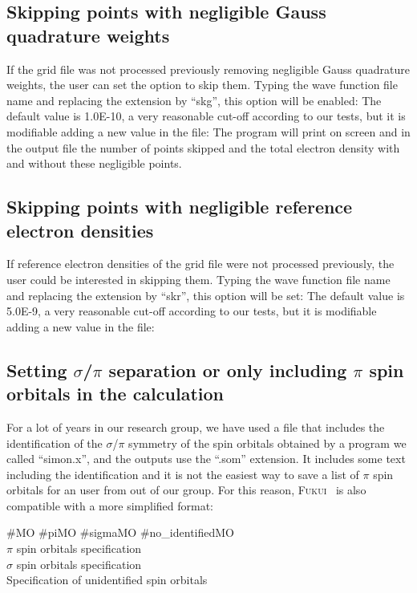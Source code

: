 \documentclass[a4paper,11pt,openany]{memoir}
\newcommand\programa{\textsc{Fukui}}
\begin{document}
\subsection{Skipping points with negligible Gauss quadrature weights}
If the grid file was not processed previously removing negligible Gauss quadrature weights, the user can set the option to skip them. Typing the wave function file name and replacing the extension by ``skg'', this option will be enabled:
The default value is \num{1.0E-10}, a very reasonable cut-off according to our tests, but it is modifiable adding a new value in the file:
The program will print on screen and in the output file the number of points skipped and  the total electron density with and without these negligible points.

\subsection{Skipping points with negligible reference electron densities}
If reference electron densities of the grid file were not processed previously, the user could be interested in skipping them. Typing the wave function file name and replacing the extension by ``skr'', this option will be set:
The default value is \num{5.0E-9}, a very reasonable cut-off according to our tests, but it is modifiable adding a new value in the file:

\subsection{Setting $\sigma$/$\pi$ separation or only including $\pi$ spin orbitals in the calculation}
For a lot of years in our research group, we have used a file that includes the identification of the $\sigma$/$\pi$ symmetry of the spin orbitals obtained by a program we called ``simon.x'', and the outputs use the ``.som'' extension. It includes some text including the identification and it is not the easiest way to save a list of $\pi$ spin orbitals for an user from out of our group. For this reason, \programa~ is also compatible with a more simplified format:
\begin{tcolorbox}[
	colback=blue!5!black!5!,
	colframe=blue!75!black,
	fontupper=\bfseries,
	colupper=blue!5!black,
	colbacktitle=blue!75!black,
	size=small,
	title={Structure and format of a .sg file}
				]
					\#MO \#piMO \#sigmaMO \#no\_identifiedMO\\
					$\pi$ spin orbitals specification\\
					$\sigma$ spin orbitals specification\\
					Specification of unidentified spin orbitals\\
\end{tcolorbox}
\end{document}
